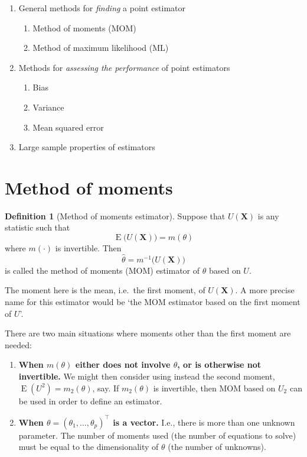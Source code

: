 \documentclass[
]{book}
\providecommand{\tightlist}{%
  \setlength{\itemsep}{0pt}\setlength{\parskip}{0pt}}
\newcommand{\bX}{{\boldsymbol X}}
\DeclareMathOperator{\E}{E}
\theoremstyle{definition}
\newtheorem{definition}{Definition}[chapter]
\theoremstyle{definition}
\theoremstyle{definition}
\theoremstyle{definition}
\theoremstyle{remark}
\begin{document}
\begin{enumerate}
\def\labelenumi{\arabic{enumi}.}
\tightlist
\item
  General methods for \emph{finding} a point estimator

  \begin{enumerate}
  \def\labelenumii{\alph{enumii}.}
  \tightlist
  \item
    Method of moments (MOM)
  \item
    Method of maximum likelihood (ML)
  \end{enumerate}
\item
  Methods for \emph{assessing the performance} of point estimators

  \begin{enumerate}
  \def\labelenumii{\alph{enumii}.}
  \tightlist
  \item
    Bias
  \item
    Variance
  \item
    Mean squared error
  \end{enumerate}
\item
  Large sample properties of estimators
\end{enumerate}

\hypertarget{method-of-moments}{%
\section{Method of moments}\label{method-of-moments}}

\begin{definition}[Method of moments estimator]
Suppose that \(U(\bX)\) is any statistic such that
\[
  \E\big(U(\bX)\big) = m(\theta)
\]
where \(m(\cdot)\) is invertible. Then
\[
  \hat\theta = m^{-1}\big(U(\bX)\big)
\]
is called the method of moments (MOM) estimator of \(\theta\) based on \(U\).
\end{definition}

The moment here is the mean, i.e.~the first moment, of \(U(\bX)\). A more precise name for this estimator would be `the MOM estimator based on the first moment of \(U\)'.

There are two main situations where moments other than the first moment are needed:

\begin{enumerate}
\def\labelenumi{\arabic{enumi}.}
\item
  \textbf{When \(m(\theta)\) either does not involve \(\theta\), or is otherwise not invertible.} We might then consider using instead the second moment, \(\E(U^2) = m_2(\theta)\), say. If \(m_2(\theta)\) is invertible, then MOM based on \(U_2\) can be used in order to define an estimator.
\item
  \textbf{When \(\theta=(\theta_1,\dots,\theta_p)^\top\) is a vector.} I.e., there is more than one unknown parameter. The number of moments used (the number of equations to solve) must be equal to the dimensionality of \(\theta\) (the number of unknowns).
\end{enumerate}
\end{document}

